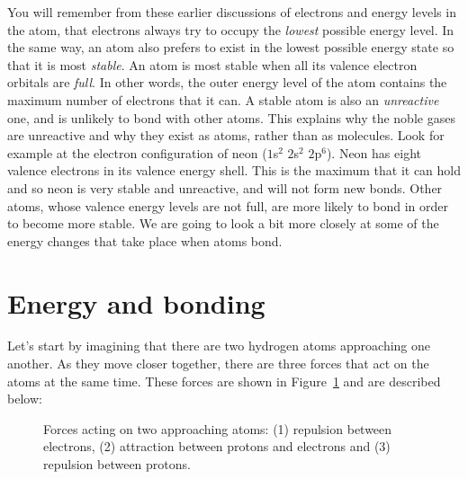 You will remember from these earlier discussions of electrons and energy levels in the atom, that electrons always try to occupy the \textit{lowest} possible energy level. In the same way, an atom also prefers to exist in the lowest possible energy state so that it is most \textit{stable}. An atom is most stable when all its valence electron orbitals are \textit{full}. In other words, the outer energy level of the atom contains the maximum number of electrons that it can. A stable atom is also an \textit{unreactive} one, and is unlikely to bond with other atoms. This explains why the noble gases are unreactive and why they exist as atoms, rather than as molecules. Look for example at the electron configuration of neon ($1$s$^{2}$ $2$s$^{2}$ $2$p$^{6}$). Neon has eight valence electrons in its valence energy shell. This is the maximum that it can hold and so neon is very stable and unreactive, and will not form new bonds. Other atoms, whose valence energy levels are not full, are more likely to bond in order to become more stable. We are going to look a bit more closely at some of the energy changes that take place when atoms bond.






\section{Energy and bonding}

Let's start by imagining that there are two hydrogen atoms approaching one another. As they move closer together, there are three forces that act on the atoms at the same time. These forces are shown in Figure~\ref{fig:bondingforces} and are described below:

\begin{figure}[H]
\begin{center}
\end{center}
\caption{Forces acting on two approaching atoms: (1) repulsion between electrons, (2) attraction between protons and electrons and (3) repulsion between protons.}
\label{fig:bondingforces}
\end{figure}

